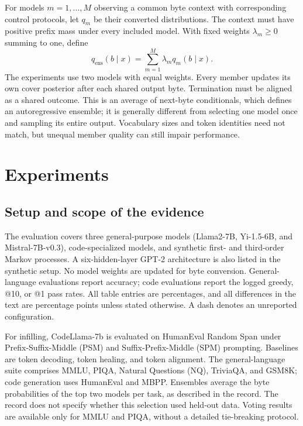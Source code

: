 \documentclass{article}
\begin{document}
For models $m=1,\ldots,M$ observing a common byte context with corresponding control protocols, let $q_m$ be their converted distributions. The context must have positive prefix mass under every included model. With fixed weights $\lambda_m\geq0$ summing to one, define
\begin{equation}
 q_{\mathrm{ens}}(b\mid x)=\sum_{m=1}^{M}\lambda_m q_m(b\mid x).
 \label{eq:ensemble}
\end{equation}
The experiments use two models with equal weights. Every member updates its own cover posterior after each shared output byte. Termination must be aligned as a shared outcome. This is an average of next-byte conditionals, which defines an autoregressive ensemble; it is generally different from selecting one model once and sampling its entire output. Vocabulary sizes and token identities need not match, but unequal member quality can still impair performance.

\section{Experiments}
\label{sec:experiments}
\subsection{Setup and scope of the evidence}
\label{sec:setup}
The evaluation covers three general-purpose models (Llama2-7B, Yi-1.5-6B, and Mistral-7B-v0.3), code-specialized models, and synthetic first- and third-order Markov processes. A six-hidden-layer GPT-2 architecture is also listed in the synthetic setup. No model weights are updated for byte conversion. General-language evaluations report accuracy; code evaluations report the logged greedy, @10, or @1 pass rates. All table entries are percentages, and all differences in the text are percentage points unless stated otherwise. A dash denotes an unreported configuration.

For infilling, CodeLlama-7b is evaluated on HumanEval Random Span under Prefix-Suffix-Middle (PSM) and Suffix-Prefix-Middle (SPM) prompting. Baselines are token decoding, token healing, and token alignment. The general-language suite comprises MMLU, PIQA, Natural Questions (NQ), TriviaQA, and GSM8K; code generation uses HumanEval and MBPP. Ensembles average the byte probabilities of the top two models per task, as described in the record. The record does not specify whether this selection used held-out data. Voting results are available only for MMLU and PIQA, without a detailed tie-breaking protocol.
\end{document}
